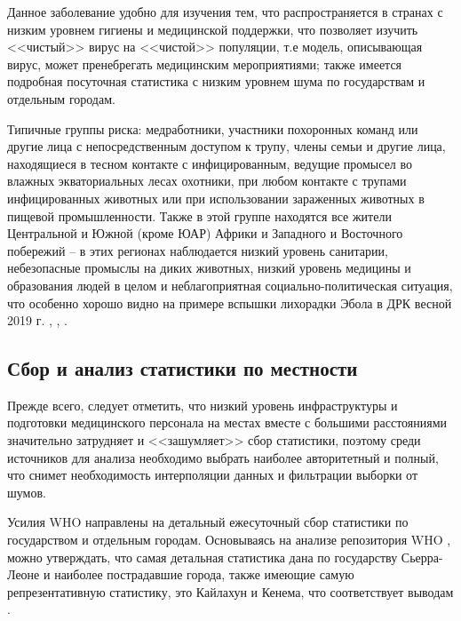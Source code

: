 Данное заболевание удобно для изучения тем, что распространяется в странах с низким уровнем гигиены и медицинской поддержки, что позволяет изучить <<чистый>> вирус на <<чистой>> популяции, т.е модель, описывающая вирус, может пренебрегать медицинским мероприятиями; также имеется подробная посуточная статистика с низким уровнем шума по государствам и отдельным городам.


Типичные группы риска: медработники, участники похоронных команд или другие лица с непосредственным доступом к трупу, члены семьи и другие лица, находящиеся в тесном контакте с инфицированным, ведущие промысел во влажных экваториальных лесах охотники, при любом контакте с трупами инфицированных животных или при использовании зараженных животных в пищевой промышленности. Также в этой группе находятся все жители Центральной и  Южной (кроме ЮАР) Африки  и Западного и Восточного  побережий -- в этих регионах наблюдается низкий уровень санитарии, небезопасные промыслы на диких животных, низкий уровень медицины и образования людей в целом и неблагоприятная социально-политическая ситуация, что особенно хорошо видно на примере вспышки лихорадки Эбола в ДРК весной 2019 г. \cite{WHOReport:25apr2019}, \cite{WHOReport:02may2019}, \cite{WHOReport:09may2019}.


\subsection{Сбор  и анализ статистики по местности}

Прежде всего, следует отметить, что низкий уровень инфраструктуры и подготовки медицинского персонала на местах вместе с большими расстояниями значительно затрудняет и <<зашумляет>> сбор статистики, поэтому среди источников для анализа необходимо выбрать наиболее авторитетный и полный, что снимет необходимость интерполяции данных и фильтрации выборки от шумов.


Усилия WHO направлены на детальный ежесуточный сбор статистики по государством и отдельным городам. Основываясь на анализе репозитория WHO \cite{github_ebola_data:2014} %
, можно утверждать, что самая детальная статистика дана по государству Сьерра-Леоне и наиболее пострадавшие города, также имеющие самую репрезентативную статистику, это Кайлахун и Кенема, что соответствует выводам \cite{Bykova:2015}%
.

